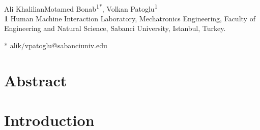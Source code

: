 \documentclass[10pt,letterpaper]{article}
\begin{document}
\vspace*{0.2in}

\begin{flushleft}
{\Large
\textbf{} %
}
\newline
\\
Ali KhalilianMotamed Bonab\textsuperscript{1*},
Volkan Patoglu\textsuperscript{1}
\\
\bigskip
\textbf{1} Human Machine Interaction Laboratory, Mechatronics Engineering, Faculty of Engineering and Natural Science, Sabanci University, Istanbul, Turkey.
\\
\bigskip

* alik/vpatoglu@sabanciuniv.edu

\end{flushleft}
\section*{Abstract}

\section*{Introduction}
\end{document}
